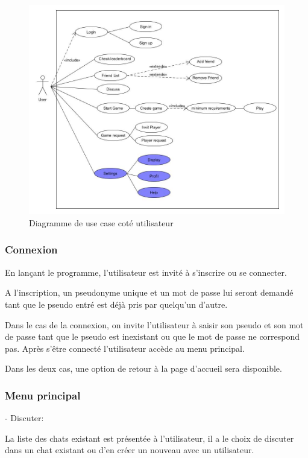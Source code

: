 \documentclass[a4paper,12pt]{article}
\begin{document}

\begin{figure}[h!]
\centering
\includegraphics[width=15cm]{UserUseCase}
\caption{Diagramme de use case coté utilisateur}
\label{fig:UerUseCase}
\end{figure}

\subsubsection{Connexion}
En lançant le programme, l'utilisateur est invité à s'inscrire ou se connecter.

A l'inscription, un pseudonyme unique et un mot de passe lui seront demandé tant que le pseudo entré est déjà pris par quelqu'un d'autre.

Dans le cas de la connexion, on invite l'utilisateur à saisir son pseudo et son mot de passe tant que le pseudo est inexistant ou que le mot de passe ne correspond pas. Après s’être connecté l'utilisateur accède au menu principal.

Dans les deux cas, une option de retour à la page d'accueil sera disponible.

\subsubsection{Menu principal}

- Discuter:

La liste des chats existant est présentée à l'utilisateur, il a le choix de discuter dans un chat existant ou d'en créer un nouveau avec un utilisateur. 
\end{document}
